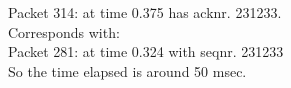 Packet 314: at time 0.375 has acknr. 231233.\\
Corresponds with:\\

Packet 281: at time 0.324 with seqnr. 231233\\
So the time elapsed is around 50 msec.